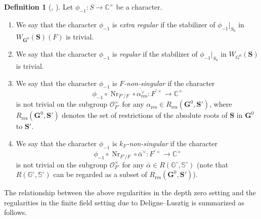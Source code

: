 \documentclass{amsart}
\newcommand{\res}{\mathrm{res}}
\newcommand{\mcO}{\mathcal{O}}
\newcommand{\C}{\mathbb{C}}
\newcommand{\bbS}{\mathbb{S}}
\newcommand{\bbG}{\mathbb{G}}
\newcommand{\bfG}{\mathbf{G}}
\newcommand{\bfS}{\mathbf{S}}
\DeclareMathOperator{\Nr}{Nr}
\theoremstyle{plain}
\theoremstyle{definition}
\newtheorem{defn}[thm]{Definition}
\theoremstyle{remark}
\theoremstyle{theorem}
\begin{document}
\begin{defn}[{\cite[Definition 3.4.16]{Kal19}, \cite[Definition 3.1.1]{Kal19-sc}}]\label{defn:reg-nonsing}
Let $\phi_{-1}\colon S\rightarrow\C^{\times}$ be a character.
\begin{enumerate}
\item
We say that the character $\phi_{-1}$ is \textit{extra regular} if the stabilizer of $\phi_{-1}|_{S_{0}}$ in $W_{\bfG^{0}}(\bfS)(F)$ is trivial.
\item
We say that the character $\phi_{-1}$ is \textit{regular} if the stabilizer of $\phi_{-1}|_{S_{0}}$ in $W_{G^{0}}(\bfS)$ is trivial.
\item
We say that the character $\phi_{-1}$ is \textit{$F$-non-singular} if the character 
\[
\phi_{-1}\circ \Nr_{F'/F}\circ\alpha^{\vee}_{\res}\colon F^{\prime\times}\rightarrow\C^{\times}
\]
is not trivial on the subgroup $\mcO_{F'}^{\times}$ for any $\alpha_{\res}\in R_{\res}(\bfG^{0},\bfS')$, where $R_{\res}(\bfG^{0},\bfS')$ denotes the set of restrictions of the absolute roots of $\bfS$ in $\bfG^{0}$ to $\bfS'$.
\item
We say that the character $\phi_{-1}$ is \textit{$k_{F}$-non-singular} if the character 
\[
\phi_{-1}\circ \Nr_{F'/F}\circ\bar{\alpha}^{\vee}\colon F^{\prime\times}\rightarrow\C^{\times}
\]
is not trivial on the subgroup $\mcO_{F'}^{\times}$ for any $\bar{\alpha}\in R(\bbG^{\circ},\bbS^{\circ})$ (note that $R(\bbG^{\circ},\bbS^{\circ})$ can be regarded as a subset of $R_{\res}(\bfG^{0},\bfS')$).
\end{enumerate}
\end{defn}

The relationship between the above regularities in the depth zero setting and the regularities in the finite field setting due to Deligne--Lusztig is summarized as follows.
\end{document}
